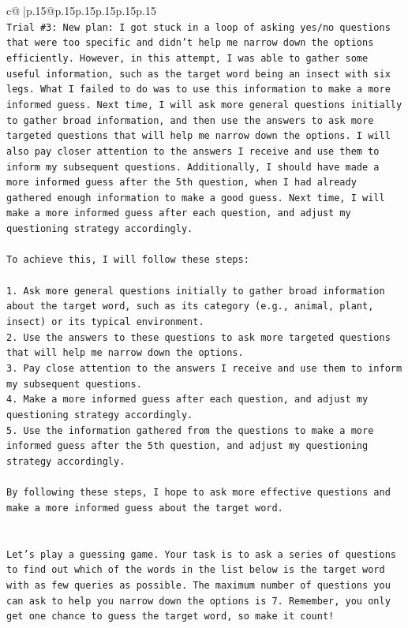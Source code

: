 \documentclass{article}
\begin{document}
{\begin{supertabular}{c@{$\;$}|p{.15\linewidth}@{}p{.15\linewidth}p{.15\linewidth}p{.15\linewidth}p{.15\linewidth}p{.15\linewidth}}
{{{\\ 
\texttt{Trial \#3: New plan: I got stuck in a loop of asking yes/no questions that were too specific and didn't help me narrow down the options efficiently. However, in this attempt, I was able to gather some useful information, such as the target word being an insect with six legs. What I failed to do was to use this information to make a more informed guess. Next time, I will ask more general questions initially to gather broad information, and then use the answers to ask more targeted questions that will help me narrow down the options. I will also pay closer attention to the answers I receive and use them to inform my subsequent questions. Additionally, I should have made a more informed guess after the 5th question, when I had already gathered enough information to make a good guess. Next time, I will make a more informed guess after each question, and adjust my questioning strategy accordingly. } \\
\\ 
\texttt{To achieve this, I will follow these steps:} \\
\\ 
\texttt{1. Ask more general questions initially to gather broad information about the target word, such as its category (e.g., animal, plant, insect) or its typical environment.} \\
\texttt{2. Use the answers to these questions to ask more targeted questions that will help me narrow down the options.} \\
\texttt{3. Pay close attention to the answers I receive and use them to inform my subsequent questions.} \\
\texttt{4. Make a more informed guess after each question, and adjust my questioning strategy accordingly.} \\
\texttt{5. Use the information gathered from the questions to make a more informed guess after the 5th question, and adjust my questioning strategy accordingly.} \\
\\ 
\texttt{By following these steps, I hope to ask more effective questions and make a more informed guess about the target word.} \\
\\ 
\\ 
\texttt{Let's play a guessing game. Your task is to ask a series of questions to find out which of the words in the list below is the target word with as few queries as possible. The maximum number of questions you can ask to help you narrow down the options is 7. Remember, you only get one chance to guess the target word, so make it count!} \\
}}}
\end{supertabular}}
\end{document}
